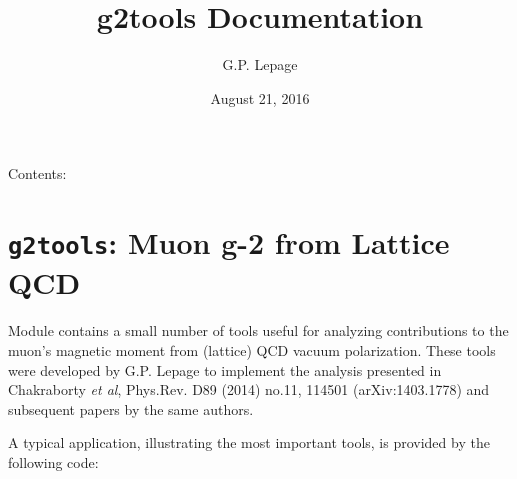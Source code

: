 \documentclass[letterpaper,10pt,english]{sphinxmanual}
\title{g2tools Documentation}
\date{August 21, 2016}
\author{G.P. Lepage}
\begin{document}
\maketitle
\tableofcontents
{}\label{index::doc}


Contents:


\chapter{\texttt{g2tools}: Muon g-2 from Lattice QCD}
\label{overview:g2tools-documentation}\label{overview::doc}\label{overview:g2tools-muon-g-2-from-lattice-qcd}
Module {\hyperref[g2tools:module-g2tools]{\emph{}}} contains a small number of tools useful for analyzing
contributions to the muon's magnetic moment from (lattice) QCD vacuum
polarization. These tools were developed by G.P. Lepage to implement the
analysis presented in Chakraborty \emph{et al}, Phys.Rev. D89 (2014) no.11, 114501
(arXiv:1403.1778) and subsequent papers by the same authors.

A typical application, illustrating the most important tools, is
provided by the following code:
\end{document}
